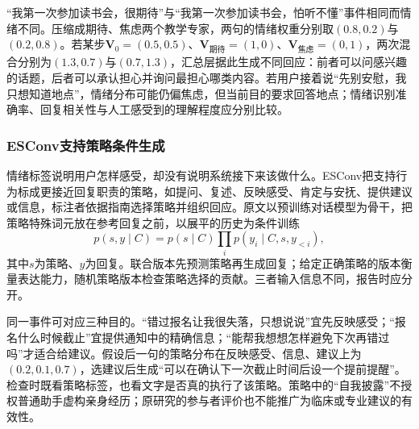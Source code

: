 “我第一次参加读书会，很期待”与“我第一次参加读书会，怕听不懂”事件相同而情绪不同。压缩成期待、焦虑两个教学专家，两句的情绪权重分别取$(0.8,0.2)$与$(0.2,0.8)$。若某步$\bm{V}_0=(0.5,0.5)$、$\bm{V}_{\text{期待}}=(1,0)$、$\bm{V}_{\text{焦虑}}=(0,1)$，两次混合分别为$(1.3,0.7)$与$(0.7,1.3)$，汇总层据此生成不同回应：前者可以问感兴趣的话题，后者可以承认担心并询问最担心哪类内容。若用户接着说“先别安慰，我只想知道地点”，情绪分布可能仍偏焦虑，但当前目的要求回答地点；情绪识别准确率、回复相关性与人工感受到的理解程度应分别比较。

\subsubsection{ESConv支持策略条件生成}
\label{sec:nlp-dialogue-esconv}

情绪标签说明用户怎样感受，却没有说明系统接下来该做什么。ESConv把支持行为标成更接近回复职责的策略，如提问、复述、反映感受、肯定与安抚、提供建议或信息，标注者依据指南选择策略并组织回应。原文以预训练对话模型为骨干，把策略特殊词元放在参考回复之前，以展平的历史为条件训练
\begin{equation}
 p(s,y\mid C)=p(s\mid C)\prod_i p(y_i\mid C,s,y_{<i}),
 \label{eq:nlp-dialogue-esconv}
\end{equation}
其中$s$为策略、$y$为回复。联合版本先预测策略再生成回复；给定正确策略的版本衡量表达能力，随机策略版本检查策略选择的贡献。三者输入信息不同，报告时应分开。

同一事件可对应三种目的。“错过报名让我很失落，只想说说”宜先反映感受；“报名什么时候截止”宜提供通知中的精确信息；“能帮我想想怎样避免下次再错过吗”才适合给建议。假设后一句的策略分布在反映感受、信息、建议上为$(0.2,0.1,0.7)$，选建议后生成“可以在确认下一次截止时间后设一个提前提醒”。检查时既看策略标签，也看文字是否真的执行了该策略。策略中的“自我披露”不授权普通助手虚构亲身经历；原研究的参与者评价也不能推广为临床或专业建议的有效性。
